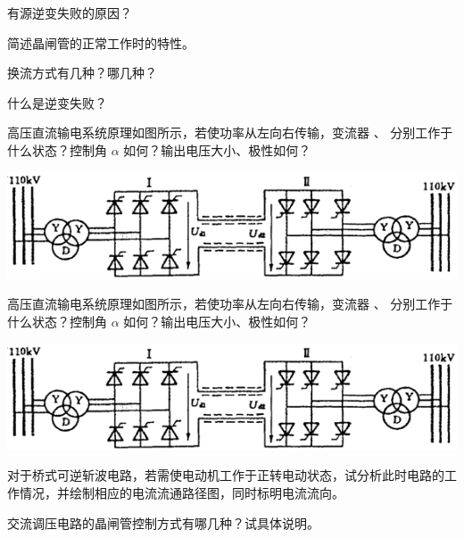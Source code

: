 \documentclass[电力电子]{subfiles}
\begin{document}
\begin{ti}[5 分]
	有源逆变失败的原因？
\end{ti}

\begin{ti}[5 分]
	简述晶闸管的正常工作时的特性。
\end{ti}

\begin{ti}[5 分]
	换流方式有几种？哪几种？
\end{ti}

\begin{ti}[5 分]
	什么是逆变失败？
\end{ti}

\begin{ti}[10 分]
	高压直流输电系统原理如图所示，若使功率从左向右传输，变流器 、 分别工作于什么状态？控制角 $\alpha$ 如何？输出电压大小、极性如何？
	\begin{center}
		\includegraphics{figure/fig4.png}
	\end{center}
\end{ti}

\begin{ti}[10 分]
	高压直流输电系统原理如图所示，若使功率从左向右传输，变流器 、 分别工作于什么状态？控制角 $\alpha$ 如何？输出电压大小、极性如何？
	\begin{center}
		\includegraphics{figure/fig4.png}
	\end{center}
\end{ti}

\begin{ti}[10 分]
	对于桥式可逆斩波电路，若需使电动机工作于正转电动状态，试分析此时电路的工作情况，并绘制相应的电流流通路径图，同时标明电流流向。
\end{ti}

\begin{ti}[5 分]
	交流调压电路的晶闸管控制方式有哪几种？试具体说明。
\end{ti}
\end{document}
